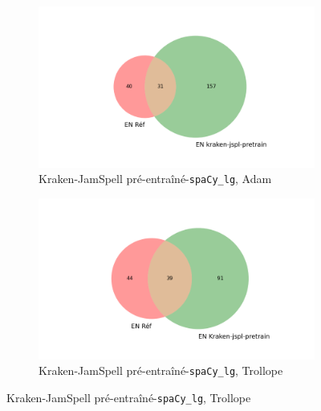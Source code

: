 \begin{figure}
  \begin{minipage}{7cm}
  \begin{subfigure}{1\textwidth}
  \includegraphics[width=1\textwidth]{IMAGES/ELTeC_INTERSECTIONS_spaCy3.5.1/ADAM_Mon-village_Kraken-base_jamspell-pretrain-fr.txt_spacy-lg-concat.json_intersection.png}
   \caption{Kraken-JamSpell pré-entraîné-\texttt{spaCy\_lg}, Adam}
  \label{fig: }
  \end{subfigure}
  \end{minipage}
   \begin{minipage}{7cm}
  \begin{subfigure}{1\textwidth}
  \includegraphics[width=1\textwidth]{IMAGES/ELTeC_INTERSECTIONS_spaCy3.5.1/TROLLOPE_Adventure_Kraken_jamspell-cor.txt_spacy-lg-concat.json_intersection.png}
   \caption{Kraken-JamSpell pré-entraîné-\texttt{spaCy\_lg}, Trollope}
 
  \label{fig:TROLLOPPE_INTERSECTION_JSPL_BASE}
  \end{subfigure}
  \end{minipage}



\end{figure}
